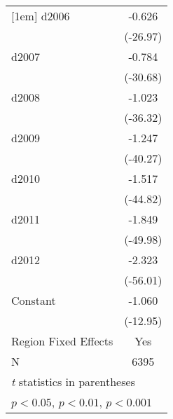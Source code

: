 {\begin{longtable}{l*{1}{c}}
[1em]
d2006               &      -0.626\sym{***}\\
                    &    (-26.97)         \\
[1em]
d2007               &      -0.784\sym{***}\\
                    &    (-30.68)         \\
[1em]
d2008               &      -1.023\sym{***}\\
                    &    (-36.32)         \\
[1em]
d2009               &      -1.247\sym{***}\\
                    &    (-40.27)         \\
[1em]
d2010               &      -1.517\sym{***}\\
                    &    (-44.82)         \\
[1em]
d2011               &      -1.849\sym{***}\\
                    &    (-49.98)         \\
[1em]
d2012               &      -2.323\sym{***}\\
                    &    (-56.01)         \\
[1em]
Constant            &      -1.060\sym{***}\\
                    &    (-12.95)         \\
\hline
Region Fixed Effects&         Yes         \\
N                   &        6395         \\
\hline\hline
\multicolumn{2}{l}{\footnotesize \textit{t} statistics in parentheses}\\
\multicolumn{2}{l}{\footnotesize \sym{*} \(p<0.05\), \sym{**} \(p<0.01\), \sym{***} \(p<0.001\)}\\
\end{longtable}
}
